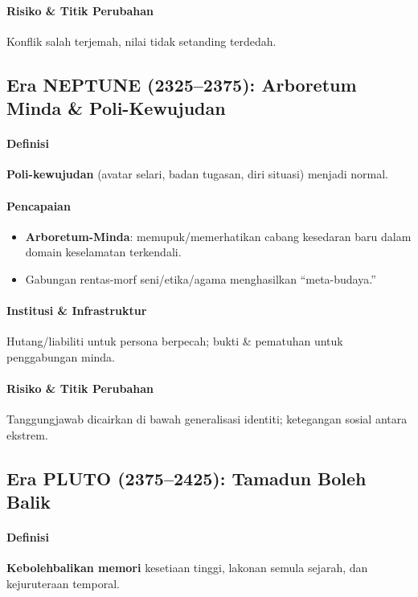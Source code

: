 \documentclass[11pt]{article}
\begin{document}
\paragraph{Risiko \& Titik Perubahan} Konflik salah terjemah, nilai tidak setanding terdedah.

\subsection{Era NEPTUNE (2325–2375): Arboretum Minda \& Poli-Kewujudan}
\paragraph{Definisi} \textbf{Poli-kewujudan} (avatar selari, badan tugasan, diri situasi) menjadi normal.

\paragraph{Pencapaian}
\begin{itemize}[noitemsep]
  \item \textbf{Arboretum-Minda}: memupuk/memerhatikan cabang kesedaran baru dalam domain keselamatan terkendali.
  \item Gabungan rentas-morf seni/etika/agama menghasilkan ``meta-budaya.''
\end{itemize}

\paragraph{Institusi \& Infrastruktur} Hutang/liabiliti untuk persona berpecah; bukti \& pematuhan untuk penggabungan minda.

\paragraph{Risiko \& Titik Perubahan} Tanggungjawab dicairkan di bawah generalisasi identiti; ketegangan sosial antara ekstrem.

\subsection{Era PLUTO (2375–2425): Tamadun Boleh Balik}
\paragraph{Definisi} \textbf{Kebolehbalikan memori} kesetiaan tinggi, lakonan semula sejarah, dan kejuruteraan temporal.
\end{document}
